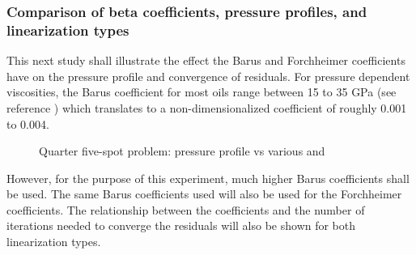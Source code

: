 \documentclass[11pt,reqno]{amsart}
\begin{document}
\subsubsection{Comparison of beta coefficients, pressure profiles, and linearization types}
This next study shall illustrate the effect the Barus and Forchheimer coefficients have on the 
pressure profile and convergence of residuals. For pressure dependent viscosities, the Barus 
coefficient for most oils range between 15 to 35 GPa (see reference \cite{G_Stachowiak}) 
which translates to a non-dimensionalized coefficient of roughly 0.001 to 0.004. 
\begin{figure}[t!]
  \centering
  \caption{Quarter five-spot problem: pressure profile vs various  and }
  \label{Fig:Quarter_spot_pressure_profile}
\end{figure}
However, for the purpose of this experiment, much higher Barus coefficients shall be used. 
The same Barus coefficients used will also be used for the Forchheimer coefficients. The 
relationship between the coefficients and the number of iterations needed to 
converge the residuals will also be shown for both linearization types.
\end{document}
